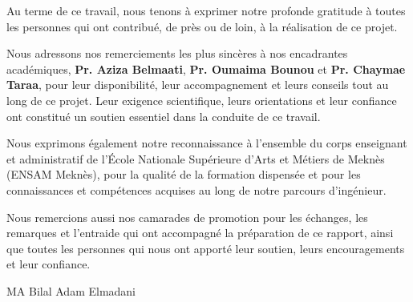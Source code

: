 Au terme de ce travail, nous tenons à exprimer notre profonde gratitude à toutes les personnes qui
ont contribué, de près ou de loin, à la réalisation de ce projet.

Nous adressons nos remerciements les plus sincères à nos encadrantes académiques,
\textbf{Pr. Aziza Belmaati}, \textbf{Pr. Oumaima Bounou} et \textbf{Pr. Chaymae Taraa}, pour leur
disponibilité, leur
accompagnement et leurs conseils tout au long de ce projet. Leur exigence scientifique, leurs
orientations et leur confiance ont constitué un soutien essentiel dans la conduite de ce travail.

Nous exprimons également notre reconnaissance à l'ensemble du corps enseignant et administratif de
l'École Nationale Supérieure d'Arts et Métiers de Meknès (ENSAM Meknès), pour la qualité de la
formation dispensée et pour les connaissances et compétences acquises au long de notre parcours
d'ingénieur.

Nous remercions aussi nos camarades de promotion pour les échanges, les remarques et l'entraide qui
ont accompagné la préparation de ce rapport, ainsi que toutes les personnes qui nous ont apporté
leur soutien, leurs encouragements et leur confiance.

\vspace{1.2em}
\begin{flushright}
MA Bilal \quad\textbullet\quad Adam Elmadani
\end{flushright}
